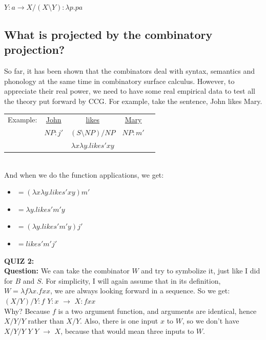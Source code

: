 \documentclass[12pt,a4paper]{article}
\begin{document}
$Y:a \rightarrow X/(X\setminus Y):\lambda p.pa$\\
\subsection{What is projected by the combinatory projection?}
So far, it has been shown that the combinators deal with syntax, semantics and phonology at the same time in combinatory surface calculus. However, to appreciate their real power, we need to have some real empirical data to test all the theory put forward by CCG. For example, take the sentence, John likes Mary.\\

\begin{tabular}{ccccc}
Example: & \underline{John}   & \underline{likes} & \underline{Mary}  \\
         & $NP:j'$ & $(S\setminus NP)/NP$   & $NP:m'$     \\
         &         & $\lambda x\lambda y.likes'xy$   &  \\ \hline
\end{tabular}\\

And when we do the function applications, we get:
\begin{itemize}
\item[]$=(\lambda x\lambda y.likes'xy)m'$
\item[]$=\lambda y.likes'm'y$
\item[]$=(\lambda y.likes'm'y)j'$
\item[]$=likes'm'j'$
\end{itemize}

\vspace{1cm}

\textbf{\Large{QUIZ 2:}}\\

\textbf{Question:} We can take the combinator $W$ and try to symbolize it, just like I did for $B$ and $S$. For simplicity, I will again assume that in its definition, $W=\lambda f\lambda x.fxx$, we are always looking forward in a sequence. So we get: $(X/Y)/Y:f$ $Y:x$ $\rightarrow$ $X:fxx$\\

Why? Because $f$ is a two argument function, and arguments are identical, hence $X/Y/Y$ rather than $X/Y$. Also, there is one input $x$ to $W$, so we don't have $X/Y/Y$ $Y$  $Y$ $\rightarrow$ $X$, because that would mean three inputs to $W$.\\
\end{document}
